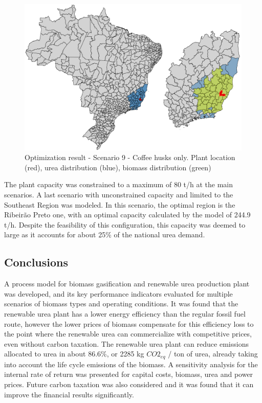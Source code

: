 \documentclass[a4paper, titlepage]{article}
\begin{document}
\begin{figure}[htb]
    \includegraphics[width=\textwidth]{img/optimization_result_9.png}
    \caption{Optimization result - Scenario 9 - Coffee husks only. Plant location (red), urea distribution (blue), biomass distribution (green)}
    \label{img_optimizationresults_9}
\end{figure}


The plant capacity was constrained to a maximum of 80 t/h at the main scenarios. A last scenario with unconstrained
capacity and limited to the Southeast Region was modeled. In this scenario, the optimal region is the Ribeirão Preto one,
with an optimal capacity calculated by the model of 244.9 t/h. Despite the feasibility of this configuration, this capacity
was deemed to large as it accounts for about 25\% of the national urea demand.

\subsection{Conclusions}

A process model for biomass gasification and renewable urea production plant was developed, and its key performance
indicators evaluated for multiple scenarios of biomass types and operating conditions. It was found that the renewable
urea plant has a lower energy efficiency than the regular fossil fuel route, however the lower prices of biomass
compensate for this efficiency loss to the point where the renewable urea can commercialize with competitive prices,
even without carbon taxation. The renewable urea plant can reduce emissions allocated to urea in about 86.6\%, or 2285
kg $CO2_{eq}$ / ton of urea, already taking into account the life cycle emissions of the biomass. A sensitivity analysis
for the internal rate of return was presented for capital costs, biomass, urea and power prices. Future carbon taxation
was also considered and it was found that it can improve the financial results significantly.
\end{document}
